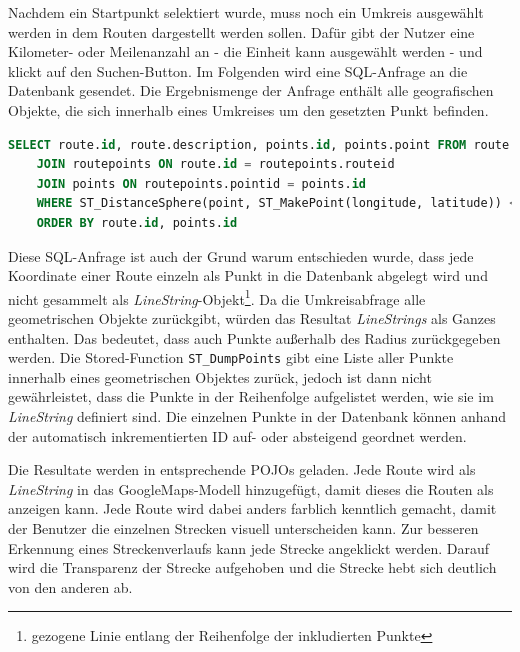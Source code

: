 \documentclass[a4paper,11pt,utf8]{scrartcl}
\begin{document}
Nachdem ein Startpunkt selektiert wurde, muss noch ein Umkreis ausgewählt werden in dem Routen dargestellt werden sollen. Dafür gibt der Nutzer eine Kilometer- oder Meilenanzahl an - die Einheit kann ausgewählt werden - und klickt auf den Suchen-Button. Im Folgenden wird eine SQL-Anfrage an die Datenbank gesendet. Die Ergebnismenge der Anfrage enthält alle geografischen Objekte, die sich innerhalb eines Umkreises um den gesetzten Punkt befinden.
\begin{lstlisting}[language=sql]
SELECT route.id, route.description, points.id, points.point FROM route 
	JOIN routepoints ON route.id = routepoints.routeid 
	JOIN points ON routepoints.pointid = points.id 
	WHERE ST_DistanceSphere(point, ST_MakePoint(longitude, latitude)) <=  radius * distanceUnit
	ORDER BY route.id, points.id
\end{lstlisting}

Diese SQL-Anfrage ist auch der Grund warum entschieden wurde, dass jede Koordinate einer Route einzeln als Punkt in die Datenbank abgelegt wird und nicht gesammelt als \textit{LineString}-Objekt\footnote{gezogene Linie entlang der Reihenfolge der inkludierten Punkte}. Da die Umkreisabfrage alle geometrischen Objekte zurückgibt, würden das Resultat \textit{LineStrings} als Ganzes enthalten. Das bedeutet, dass auch Punkte außerhalb des Radius zurückgegeben werden. Die Stored-Function \texttt{ST\_DumpPoints} gibt eine Liste aller Punkte innerhalb eines geometrischen Objektes zurück, jedoch ist dann nicht gewährleistet, dass die Punkte in der Reihenfolge aufgelistet werden, wie sie im \textit{LineString} definiert sind. Die einzelnen Punkte in der Datenbank können anhand der automatisch inkrementierten ID auf- oder absteigend geordnet werden.

Die Resultate werden in entsprechende POJOs geladen. Jede Route wird als \textit{LineString} in das GoogleMaps-Modell hinzugefügt, damit dieses die Routen als anzeigen kann. Jede Route wird dabei anders farblich kenntlich gemacht, damit der Benutzer die einzelnen Strecken visuell unterscheiden kann. Zur besseren Erkennung eines Streckenverlaufs kann jede Strecke angeklickt werden. Darauf wird die Transparenz der Strecke aufgehoben und die Strecke hebt sich deutlich von den anderen ab.
\end{document}
